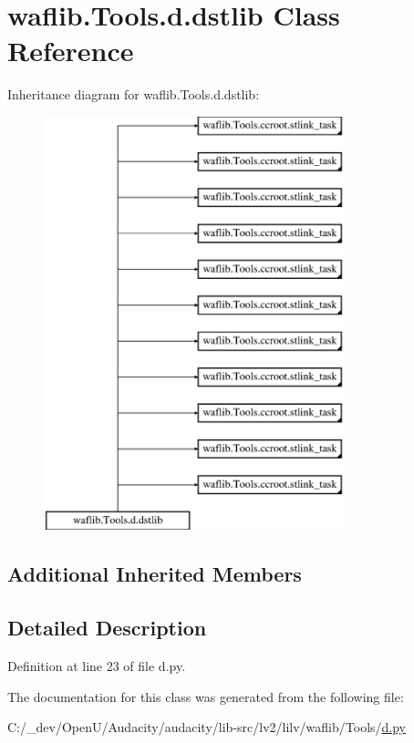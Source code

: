 \hypertarget{classwaflib_1_1_tools_1_1d_1_1dstlib}{}\section{waflib.\+Tools.\+d.\+dstlib Class Reference}
\label{classwaflib_1_1_tools_1_1d_1_1dstlib}
Inheritance diagram for waflib.\+Tools.\+d.\+dstlib\+:\begin{figure}[H]
\begin{center}
\leavevmode
\includegraphics[height=12.000000cm]{classwaflib_1_1_tools_1_1d_1_1dstlib}
\end{center}
\end{figure}
\subsection*{Additional Inherited Members}


\subsection{Detailed Description}


Definition at line 23 of file d.\+py.



The documentation for this class was generated from the following file\+:\begin{DoxyCompactItemize}
\item 
C\+:/\+\_\+dev/\+Open\+U/\+Audacity/audacity/lib-\/src/lv2/lilv/waflib/\+Tools/\hyperlink{lilv_2waflib_2_tools_2d_8py}{d.\+py}\end{DoxyCompactItemize}
